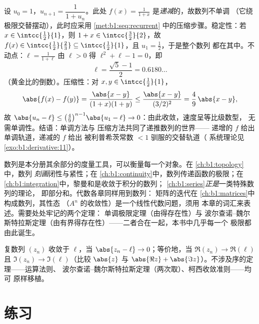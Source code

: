 \begin{example}\label{ex:b1:seq:golden}
设 $u_0 = 1$，$u_{n+1} = \dfrac{1}{1 + u_n}$。此处 $f(x) =
\frac{1}{1+x}$ 是\emph{递减}的，故数列不单调
（它绕极限交替摆动），此时应采用
\cref{met:b1:seq:recurrent} 中的压缩步骤。稳定性：若
$x \in \intcc{\frac12}{1}$，则 $1 + x \in
\intcc{\frac32}{2}$，故 $f(x) \in \intcc{\frac12}{\frac23}
\subseteq \intcc{\frac12}{1}$，且 $u_1 = \frac12$，于是整个数列
都在其中。不动点：$\ell = \frac{1}{1+\ell}$
由 $\ell > 0$ 得 $\ell^2 + \ell - 1 = 0$，即
\[
\ell = \frac{\sqrt5 - 1}{2} = 0.6180\dots
\]
（黄金比的倒数）。压缩性：对 $x, y \in
\intcc{\frac12}{1}$，
\[
\abs{f(x) - f(y)} = \frac{\abs{x - y}}{(1+x)(1+y)}
\leq \frac{\abs{x-y}}{(3/2)^2} = \frac49\,\abs{x - y} ,
\]
故 $\abs{u_n - \ell} \leq \bigl(\frac49\bigr)^{n-1}\abs{u_1 -
\ell} \to 0$：由此收敛，速度呈等比级数型，
无需单调性。结语：单调方法与
压缩方法共同了递推数列的世界——
递增的 $f$ 给出单调轨道，递减的 $f$ 给出
被利普希茨常数 $< 1$ 驯服的交替轨道（
系统理论见\cref{exo:b1:derivative:11}）。
\end{example}

\begin{remark}[本分册中的展望]
数列是本分册其余部分的度量工具，可以衡量每一个对象。在
\cref{ch:b1:topology}中，数列
\emph{刻画}闭性与紧性；在
\cref{ch:b1:continuity}中，数列传递函数的极限；在
\cref{ch:b1:integration}中，黎曼和是收敛于积分的数列；
\cref{ch:b1:series}\emph{正是}一类特殊数列的理论，
即部分和。代数各章同样用到数列：
矩阵的迭代在
\cref{ch:b1:matrices}中构成数列，其性态
（$A^n$ 的收敛性）是一个线性代数问题，须用
本章的词汇来表述。需要处处牢记的两个定理：
单调极限定理（由得存在性）与
波尔查诺--魏尔斯特拉斯定理（由有界得存在性）——二者合在一起，本书中几乎每一个
极限都由此诞生。
\end{remark}

\begin{remark}[复数列]
复数列 $(z_n)$ 收敛于 $\ell$，当
$\abs{z_n - \ell} \to 0$；等价地，当 $\Re(z_n) \to \Re(\ell)$
且 $\Im(z_n) \to \Im(\ell)$（比较 $\abs{z}$ 与 $\abs{\Re z} +
\abs{\Im z}$）。不涉及序的定理——运算法则、
波尔查诺--魏尔斯特拉斯定理（两次取）、柯西收敛准则——均可
原样移植。
\end{remark}

\section{练习}

